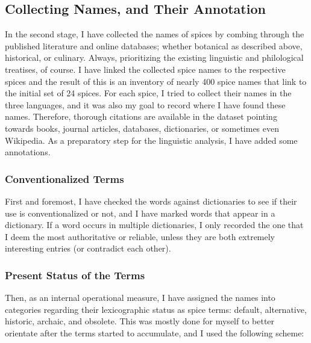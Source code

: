 
\subsection{Collecting Names, and Their Annotation}
\label{sec:collecting_names}

In the second stage, I have collected the names of spices by combing through the published literature and online databases; whether botanical as described above, historical, or culinary. Always, prioritizing the existing linguistic and philological treatises, of course. I have linked the collected spice names to the respective spices and the result of this is an inventory of nearly 400 spice names that link to the initial set of 24 spices. For each spice, I tried to collect their names in the three languages, and it was also my goal to record where I have found these names. Therefore, thorough citations are available in the dataset pointing towards books, journal articles, databases, dictionaries, or sometimes even Wikipedia. As a preparatory step for the linguistic analysis, I have added some annotations. 

\subsubsection{Conventionalized Terms}

First and foremost, I have checked the words against dictionaries to see if their use is conventionalized or not, and I have marked words that appear in a dictionary. If a word occurs in multiple dictionaries, I only recorded the one that I deem the most authoritative or reliable, unless they are both extremely interesting entries (or contradict each other).

\subsubsection{Present Status of the Terms}

Then, as an internal operational measure, I have assigned the names into categories regarding their lexicographic status as spice terms: default, alternative, historic, archaic, and obsolete. This was mostly done for myself to better orientate after the terms started to accumulate, and I used the following scheme: 

